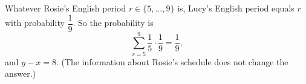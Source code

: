 Whatever Rosie's English period $r\in\{5,\dots,9\}$ is, Lucy's English period equals $r$ with probability $\dfrac19$. So the probability is
\[\sum_{r=5}^{9}\dfrac15\cdot\dfrac19=\dfrac19,\]
and $y-x=\boxed{8}$. (The information about Rosie's schedule does not change the answer.)
